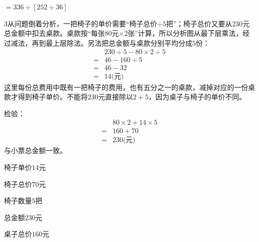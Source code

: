 \documentclass[multi=snippet,border={5bp 20bp 5bp 5bp}]{standalone}
\newenvironment{snippet}[3]{\begin{minipage}{#1bp}\color{answerred}\fontsize{#2}{#3}\selectfont\raggedright}{\end{minipage}}
\begin{document}
\begin{snippet}{92.06008300781252}{10}{12.8}\SourceSans\setlength{\mathindent}{2bp}\(\displaystyle=336\div[252\div36]\)\end{snippet}
\begin{snippet}{505}{11.5}{14}\begin{multicols}{3}\raggedcolumns 从问题倒着分析，一把椅子的单价需要“椅子总价\(\div5\)\allowbreak 把”；椅子总价又要从\(230\)\allowbreak 元总金额中扣去桌款。桌款按“每张\(80\)\allowbreak 元\(\times2\)\allowbreak 张”计算，所以分析图从最下层乘法，经过减法，再到最上层除法。另法把总金额与桌款分别平均分成\(5\)\allowbreak 份：\[\begin{aligned}&230\div5-80\times2\div5\\={}&46-160\div5\\={}&46-32\\={}&14\text{(元)}\end{aligned}\]这里每份总费用中既有一把椅子的费用，也有五分之一的桌款，减掉对应的一份桌款才得到椅子单价。不能将\(230\)\allowbreak 元直接除以\(2+5\)\allowbreak ，因为桌子与椅子的单价不同。\par 检验：\[\begin{aligned}&80\times2+14\times5\\={}&160+70\\={}&230\text{(元)}\end{aligned}\]与小票总金额一致。\end{multicols}\end{snippet}
\begin{snippet}{72.04999999999995}{8.5}{12.8}\SourceSans\setlength{\mathindent}{2bp}椅子单价\(14\)元\end{snippet}
\begin{snippet}{71.79999999999995}{8.5}{12.8}\SourceSans\setlength{\mathindent}{2bp}椅子总价\(70\)元\end{snippet}
\begin{snippet}{71.79999999999995}{8.5}{12.8}\SourceSans\setlength{\mathindent}{2bp}椅子数量\(5\)把\end{snippet}
\begin{snippet}{72.29999999999995}{8.5}{12.8}\SourceSans\setlength{\mathindent}{2bp}总金额\(230\)元\end{snippet}
\begin{snippet}{72.04999999999995}{8.5}{12.8}\SourceSans\setlength{\mathindent}{2bp}桌子总价\(160\)元\end{snippet}
\end{document}
